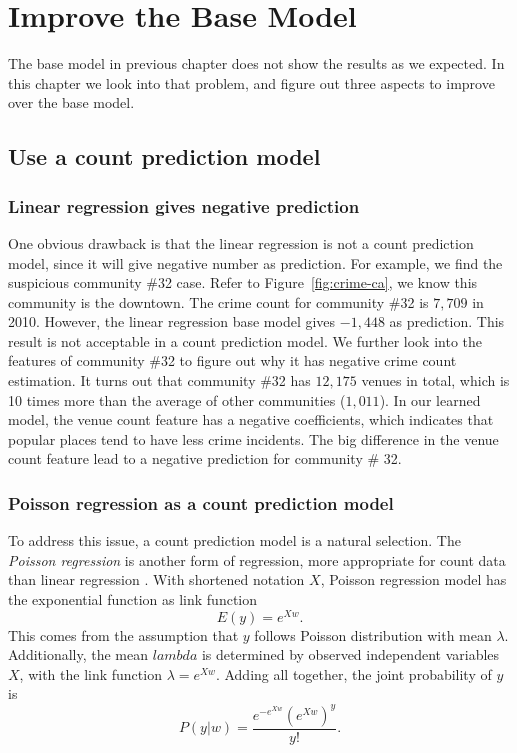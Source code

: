 \chapter{Improve the Base Model}



The base model in previous chapter does not show the results as we expected. In this chapter we look into that problem, and figure out three aspects to improve over the base model.


\section{Use a count prediction model}



\subsection{Linear regression gives negative prediction}

One obvious drawback is that the linear regression is not a count prediction model, since it will give negative number as prediction. For example, we find the suspicious community \#32 case. Refer to Figure~\ref{fig:crime-ca}, we know this community is the downtown. The crime count for community \#32 is $7,709$ in 2010. However, the linear regression base model gives $-1,448$ as prediction. This result is not acceptable in a count prediction model. We further look into the features of community \#32 to figure out why it has negative crime count estimation. It turns out that community \#32 has $12,175$ venues in total, which is 10 times more than the average of other communities ($1,011$). In our learned model, the venue count feature has a negative coefficients, which indicates that popular places tend to have less crime incidents. The big difference in the venue count feature lead to a negative prediction for community \# 32.




\subsection{Poisson regression as a count prediction model}

To address this issue, a count prediction model is a natural selection. The \emph{Poisson regression} is another form of regression, more appropriate for count data than linear regression \cite{GMS95}\cite{Lamb92}. With shortened notation $X$, Poisson regression model has the exponential function as link function
\begin{equation}
\label{eq:prm}
E(y) = e^{X w}.
\end{equation}
This comes from the assumption that $y$ follows Poisson distribution with mean $\lambda $. Additionally, the mean $lambda$ is determined by observed independent variables $X$, with the link function $\lambda = e^{Xw}$. Adding all together, the joint probability of $y$ is 
\begin{equation}
P(y|w) = \frac{e^{-e^{Xw}}(e^{Xw})^y}{y!}.
\end{equation}


